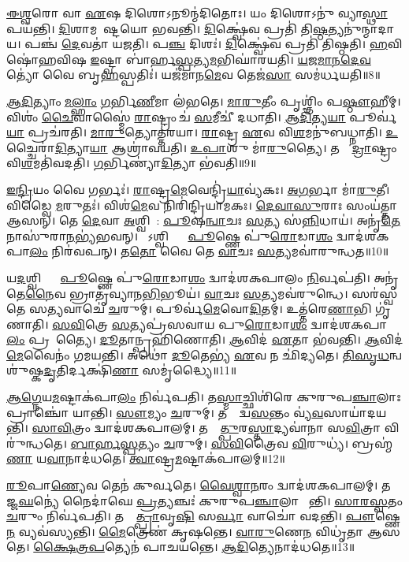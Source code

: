 \ul{𑌈}\ul{𑌶𑍍𑌵}𑌰𑍋 𑌵𑌾 \ul{𑌏}𑌷 𑌦𑌿𑌶𑍋\-𑌽𑌨𑍂𑌨𑍍𑌮॑𑌦𑌿𑌤𑍋𑌃।
𑌯𑌂 𑌦𑌿𑌶𑍋𑌽𑌨𑍁॑ 𑌵𑍍𑌯𑌾\ul{𑌸𑍍𑌥𑌾}𑌪𑌯॑𑌨𑍍𑌤𑌿।
\ul{𑌦𑌿}𑌶𑌾𑌮𑌵𑍇᳚𑌷𑍍𑌟𑌯𑍋 𑌭𑌵𑌨𑍍𑌤𑌿।
\ul{𑌦𑌿}𑌕𑍍𑌷𑍍𑌵𑍇॑𑌵 𑌪𑍍𑌰𑌤𑌿॑ 𑌤𑌿\ul{𑌷𑍍𑌠}𑌤𑍍𑌯𑌨𑍁॑𑌨𑍍𑌮𑌾𑌦𑌾𑌯।
𑌪𑌞𑍍𑌚॑ \ul{𑌦𑍇}𑌵𑌤𑌾॑ 𑌯𑌜𑌤𑌿।
𑌪\ul{𑌞𑍍𑌚} 𑌦𑌿𑌶𑌃॑।
\ul{𑌦𑌿}𑌕𑍍𑌷𑍍𑌵𑍇॑𑌵 𑌪𑍍𑌰𑌤𑌿॑ 𑌤𑌿𑌷𑍍𑌠𑌤𑌿।
\ul{𑌹}𑌵𑌿𑌷𑍋॑𑌹𑌵𑌿𑌷 \ul{𑌇}𑌷𑍍𑌟𑍍𑌵𑌾 𑌬𑌾॑𑌰𑍍\mbox{}𑌹\ul{𑌸𑍍𑌪}𑌤𑍍𑌯\ul{𑌮}𑌭𑌿𑌘𑌾॑𑌰𑌯𑌤𑌿।
\ul{𑌯}\ul{𑌜}\ul{𑌮𑌾}\ul{𑌨}\ul{𑌦𑍇}\ul{𑌵}𑌤𑍍𑌯𑍋॑ 𑌵𑍈 𑌬𑍃\ul{𑌹}𑌸𑍍𑌪𑌤𑌿𑌃॑।
𑌯𑌜॑𑌮𑌾𑌨\ul{𑌮𑍇}𑌵 𑌤𑍇𑌜॑\ul{𑌸𑌾} 𑌸𑌮॑𑌰𑍍𑌧𑌯𑌤𑌿॥8॥

\ul{𑌆}\ul{𑌦𑌿}𑌤𑍍𑌯𑌾𑌂 \ul{𑌮}\ul{𑌲𑍍}𑌹𑌾𑌂 \ul{𑌗}𑌰𑍍𑌭𑌿\ul{𑌣𑍀}𑌮𑌾 𑌲॑𑌭𑌤𑍇।
\ul{𑌮𑌾}\ul{𑌰𑍁}𑌤𑍀𑌂 𑌪𑍃𑌶𑍍𑌞𑌿𑌂॑ 𑌪\ul{𑌷𑍍𑌠𑍗}𑌹𑍀𑌮𑍍।
𑌵𑌿𑌶𑌂॑ \ul{𑌚𑍈}𑌵𑌾𑌸𑍍𑌮𑍈॑ \ul{𑌰𑌾}𑌷𑍍𑌟𑍍𑌰𑌂 𑌚॑ \ul{𑌸}𑌮𑍀𑌚𑍀॑ 𑌦𑌧𑌾𑌤𑌿।
\ul{𑌆}\ul{𑌦𑌿}𑌤𑍍𑌯\ul{𑌯𑌾} 𑌪𑍂𑌰𑍍𑌵॑\ul{𑌯𑌾} 𑌪𑍍𑌰𑌚॑𑌰𑌤𑌿।
\ul{𑌮𑌾}\ul{𑌰𑍁}𑌤𑍍𑌯𑍋𑌤𑍍𑌤॑𑌰𑌯𑌾।
\ul{𑌰𑌾}𑌷𑍍𑌟𑍍𑌰 \ul{𑌏}𑌵 𑌵𑌿\ul{𑌶}𑌮𑌨𑍁॑𑌬𑌧𑍍𑌨𑌾𑌤𑌿।
\ul{𑌉}𑌚𑍍𑌚𑍈𑌰𑌾॑\ul{𑌦𑌿}𑌤𑍍𑌯𑌾\ul{𑌯𑌾} 𑌆𑌶𑍍𑌰𑌾॑𑌵𑌯𑌤𑌿।
\ul{𑌉}\ul{𑌪𑌾}\ul{}𑌶𑍁 𑌮𑌾॑\ul{𑌰𑍁}𑌤𑍍𑌯𑍈।
𑌤𑌸𑍍𑌮𑌾᳚\ul{𑌦𑍍𑌰𑌾}𑌷𑍍𑌟𑍍𑌰𑌂 𑌵𑌿\ul{𑌶}𑌮𑌤𑌿॑𑌵𑌦𑌤𑌿।
\ul{𑌗}𑌰𑍍𑌭𑌿𑌣𑍍𑌯𑌾॑\ul{𑌦𑌿}𑌤𑍍𑌯𑌾 𑌭॑𑌵𑌤𑌿॥9॥

\ul{𑌇}\ul{𑌨𑍍𑌦𑍍𑌰𑌿}𑌯𑌂 𑌵𑍈 𑌗𑌰𑍍𑌭𑌃॑।
\ul{𑌰𑌾}𑌷𑍍𑌟𑍍𑌰\ul{𑌮𑍇}𑌵𑍇𑌨𑍍𑌦𑍍𑌰𑌿॑\ul{𑌯𑌾}𑌵𑍍𑌯॑𑌕𑌃।
\ul{𑌅}\ul{𑌗}𑌰𑍍𑌭𑌾 𑌮𑌾॑\ul{𑌰𑍁}𑌤𑍀।
𑌵𑌿𑌡𑍍𑌵𑍈 \ul{𑌮}𑌰𑍁𑌤𑌃॑।
𑌵𑌿𑌶॑\ul{𑌮𑍇}𑌵 𑌨𑌿𑌰𑌿॑𑌨𑍍𑌦𑍍𑌰𑌿𑌯𑌾𑌮𑌕𑌃।
\ul{𑌦𑍇}\ul{𑌵𑌾}\ul{𑌸𑍁}𑌰𑌾𑌃 𑌸𑌂𑌯॑𑌤𑍍𑌤𑌾 𑌆𑌸𑌨𑍍।
𑌤𑍇 \ul{𑌦𑍇}𑌵𑌾 \ul{𑌅}𑌶𑍍𑌵𑌿𑌨𑍋᳚: \ul{𑌪𑍂}𑌷\ul{𑌨𑍍𑌵𑌾}𑌚𑌃 \ul{𑌸}𑌤𑍍𑌯 𑌸॑\ul{𑌨𑍍𑌨𑌿}𑌧𑌾𑌯॑।
𑌅𑌨𑍃॑\ul{𑌤𑍇}𑌨𑌾𑌸𑍁॑𑌰𑌾\ul{𑌨}𑌭𑍍𑌯॑𑌭𑌵𑌨𑍍।
𑌤𑍇᳚𑌽𑌶𑍍𑌵𑌿𑌭𑍍𑌯𑌾𑌂᳚ \ul{𑌪𑍂}𑌷𑍍𑌣𑍇 𑌪𑍁॑\ul{𑌰𑍋}𑌡𑌾\ul{𑌶𑌂} 𑌦𑍍𑌵𑌾𑌦॑𑌶𑌕𑌪𑌾\ul{𑌲𑌂} 𑌨𑌿𑌰॑𑌵𑌪𑌨𑍍।
𑌤\ul{𑌤𑍋} 𑌵𑍈 𑌤𑍇 \ul{𑌵𑌾}𑌚𑌃 \ul{𑌸}𑌤𑍍𑌯𑌮𑌵𑌾॑𑌰𑍁𑌨𑍍𑌧𑌤॥10॥

𑌯\ul{𑌦}𑌶𑍍𑌵𑌿𑌭𑍍𑌯𑌾𑌂᳚ \ul{𑌪𑍂}𑌷𑍍𑌣𑍇 𑌪𑍁॑\ul{𑌰𑍋}𑌡𑌾\ul{𑌶𑌂} 𑌦𑍍𑌵𑌾𑌦॑𑌶𑌕𑌪𑌾𑌲𑌂 \ul{𑌨𑌿}𑌰𑍍𑌵𑌪॑𑌤𑌿।
𑌅𑌨𑍃॑𑌤𑍇\ul{𑌨𑍈}𑌵 𑌭𑍍𑌰𑌾𑌤𑍃॑𑌵𑍍𑌯𑌾𑌨\ul{𑌭𑌿}𑌭𑍂𑌯॑।
\ul{𑌵𑌾}𑌚𑌃 \ul{𑌸}𑌤𑍍𑌯𑌮𑌵॑𑌰𑍁𑌨𑍍𑌧𑍇।
𑌸𑌰॑𑌸𑍍𑌵𑌤𑍇 𑌸\ul{𑌤𑍍𑌯}𑌵𑌾𑌚𑍇॑ \ul{𑌚}𑌰𑍁𑌮𑍍।
𑌪𑍂𑌰𑍍𑌵॑\ul{𑌮𑍇}𑌵𑍋\ul{𑌦𑌿}𑌤𑌮𑍍।
𑌉𑌤𑍍𑌤॑𑌰𑍇\ul{𑌣𑌾}𑌭𑌿 𑌗𑍃॑𑌣𑌾𑌤𑌿।
\ul{𑌸}\ul{𑌵𑌿}𑌤𑍍𑌰𑍇 \ul{𑌸}𑌤𑍍𑌯𑌪𑍍𑌰॑𑌸𑌵𑌾𑌯 𑌪𑍁\ul{𑌰𑍋}𑌡𑌾\ul{𑌶𑌂} 𑌦𑍍𑌵𑌾𑌦॑𑌶𑌕𑌪𑌾\ul{𑌲𑌂} 𑌪𑍍𑌰𑌸𑍂᳚𑌤𑍍𑌯𑍈।
\ul{𑌦𑍂}𑌤𑌾𑌨𑍍𑌪𑍍𑌰𑌹𑌿॑𑌣𑍋𑌤𑌿।
\ul{𑌆}𑌵𑌿𑌦॑ \ul{𑌏}𑌤𑌾 𑌭॑𑌵𑌨𑍍𑌤𑌿।
\ul{𑌆}𑌵𑌿𑌦॑\ul{𑌮𑍇}𑌵𑍈𑌨𑌂॑ 𑌗𑌮𑌯𑌨𑍍𑌤𑌿।
𑌅𑌥𑍋॑ \ul{𑌦𑍂}𑌤𑍇𑌭𑍍𑌯॑ \ul{𑌏}𑌵 𑌨 𑌛𑌿॑𑌦𑍍𑌯𑌤𑍇।
\ul{𑌤𑌿}\ul{𑌸𑍃}\ul{𑌧}𑌨𑍍𑌵 𑌶𑍁॑𑌷𑍍𑌕\ul{𑌦𑍃}𑌤𑌿𑌰𑍍𑌦𑌕𑍍𑌷𑌿॑\ul{𑌣𑌾} 𑌸𑌮𑍃॑𑌦𑍍𑌧𑍍𑌯𑍈॥11॥\anuvakamend[\ul{𑌅}\ul{𑌰𑍍𑌧}\ul{𑌯}\ul{𑌤𑌿} \ul{𑌭}\ul{𑌵}\ul{𑌤𑍍𑌯}\ul{𑌰𑍁}\ul{𑌨𑍍𑌧}\ul{𑌤} \ul{𑌗}\ul{𑌮}\ul{𑌯}\ul{𑌨𑍍𑌤𑌿} 𑌦𑍍𑌵𑍇 𑌚॑]

\ul{𑌆}\ul{𑌗𑍍𑌨𑍇}𑌯\ul{𑌮}𑌷𑍍𑌟𑌾𑌕॑𑌪𑌾\ul{𑌲𑌂} 𑌨𑌿𑌰𑍍𑌵॑𑌪𑌤𑌿।
𑌤\ul{𑌸𑍍𑌮𑌾}𑌚𑍍𑌛𑌿𑌶𑌿॑𑌰𑍇 𑌕𑍁𑌰𑍁𑌪\ul{𑌞𑍍𑌚𑌾}𑌲𑌾𑌃 𑌪𑍍𑌰𑌾𑌞𑍍𑌚𑍋॑ 𑌯𑌾𑌨𑍍𑌤𑌿।
\ul{𑌸𑍗}𑌮𑍍𑌯𑌂 \ul{𑌚}𑌰𑍁𑌮𑍍।
𑌤𑌸𑍍𑌮𑌾᳚𑌦𑍍𑌵\ul{𑌸}𑌨𑍍𑌤𑌂 𑌵𑍍𑌯॑\ul{𑌵}𑌸𑌾𑌯𑌾॑𑌦𑌯𑌨𑍍𑌤𑌿।
\ul{𑌸𑌾}\ul{𑌵𑌿}𑌤𑍍𑌰𑌂 𑌦𑍍𑌵𑌾𑌦॑𑌶𑌕𑌪𑌾𑌲𑌮𑍍।
𑌤𑌸𑍍𑌮𑌾᳚\ul{𑌤𑍍𑌪𑍁}𑌰\ul{𑌸𑍍𑌤𑌾}𑌦𑍍𑌯𑌵𑌾॑𑌨𑌾 𑌸\ul{𑌵𑌿}𑌤𑍍𑌰𑌾 𑌵𑌿𑌰𑍁॑𑌨𑍍𑌧𑌤𑍇।
\ul{𑌬𑌾}\ul{𑌰𑍍}\ul{𑌹}\ul{𑌸𑍍𑌪}𑌤𑍍𑌯𑌂 \ul{𑌚}𑌰𑍁𑌮𑍍।
\ul{𑌸}\ul{𑌵𑌿}𑌤𑍍𑌰𑍈𑌵 \ul{𑌵𑌿}𑌰𑍁𑌧𑍍𑌯॑।
𑌬𑍍𑌰𑌹𑍍𑌮॑\ul{𑌣𑌾} 𑌯\ul{𑌵𑌾}𑌨𑌾𑌦॑𑌧𑌤𑍇।
\ul{𑌤𑍍𑌵𑌾}𑌷𑍍𑌟𑍍𑌰\ul{𑌮}𑌷𑍍𑌟𑌾𑌕॑𑌪𑌾𑌲𑌮𑍍॥12॥

\ul{𑌰𑍂}𑌪𑌾\ul{𑌣𑍍𑌯𑍇}𑌵 𑌤𑍇𑌨॑ 𑌕𑍁𑌰𑍍𑌵𑌤𑍇।
\ul{𑌵𑍈}\ul{𑌶𑍍𑌵𑌾}\ul{𑌨}𑌰𑌂 𑌦𑍍𑌵𑌾𑌦॑𑌶𑌕𑌪𑌾𑌲𑌮𑍍।
𑌤𑌸𑍍𑌮𑌾᳚𑌜𑍍𑌜\ul{𑌘}𑌨𑍍𑌯𑍇॑ 𑌨𑍈𑌦𑌾॑𑌘𑍇 \ul{𑌪𑍍𑌰}𑌤𑍍𑌯𑌞𑍍𑌚𑌃॑ 𑌕𑍁𑌰𑍁𑌪\ul{𑌞𑍍𑌚𑌾}𑌲𑌾 𑌯𑌾᳚𑌨𑍍𑌤𑌿।
\ul{𑌸𑌾}\ul{𑌰}\ul{𑌸𑍍𑌵}𑌤𑌂 \ul{𑌚}𑌰𑍁𑌂 𑌨𑌿𑌰𑍍𑌵॑𑌪𑌤𑌿।
𑌤𑌸𑍍𑌮𑌾᳚\ul{𑌤𑍍𑌪𑍍𑌰𑌾}𑌵𑍃\ul{𑌷𑌿} 𑌸\ul{𑌰𑍍𑌵𑌾} 𑌵𑌾𑌚𑍋॑ 𑌵𑌦𑌨𑍍𑌤𑌿।
\ul{𑌪𑍗}𑌷𑍍𑌣𑍇\ul{𑌨} 𑌵𑍍𑌯𑌵॑𑌸𑍍𑌯𑌨𑍍𑌤𑌿।
\ul{𑌮𑍈}𑌤𑍍𑌰𑍇𑌣॑ 𑌕𑍃𑌷𑌨𑍍𑌤𑍇।
\ul{𑌵𑌾}\ul{𑌰𑍁}𑌣𑍇\ul{𑌨} 𑌵𑌿𑌧𑍃॑𑌤𑌾 𑌆𑌸𑌤𑍇।
\ul{𑌕𑍍𑌷𑍈}\ul{𑌤𑍍𑌰}\ul{𑌪}𑌤𑍍𑌯𑍇𑌨॑ 𑌪𑌾𑌚𑌯𑌨𑍍𑌤𑍇।
\ul{𑌆}\ul{𑌦𑌿}𑌤𑍍𑌯𑍇𑌨𑌾𑌦॑𑌧𑌤𑍇॥13॥

